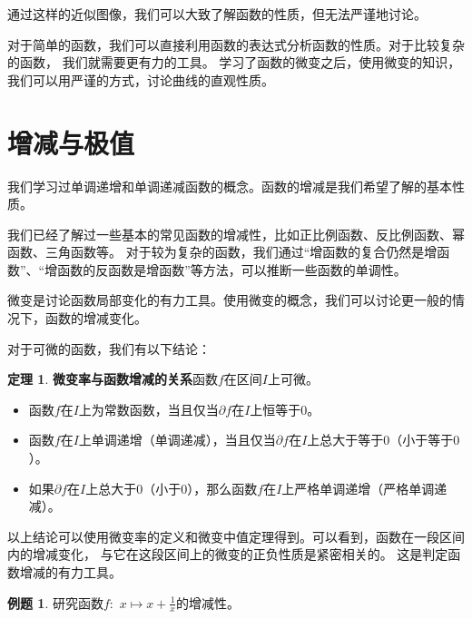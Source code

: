 \documentclass[12pt,UTF8]{ctexbook}
\theoremstyle{definition}
\newtheorem{tm}{定理}[section]
\newtheorem{et}{例题}[section]
\theoremstyle{plain}
\begin{document}
通过这样的近似图像，我们可以大致了解函数的性质，但无法严谨地讨论。

对于简单的函数，我们可以直接利用函数的表达式分析函数的性质。对于比较复杂的函数，
我们就需要更有力的工具。
学习了函数的微变之后，使用微变的知识，我们可以用严谨的方式，讨论曲线的直观性质。

\section{增减与极值}

我们学习过单调递增和单调递减函数的概念。函数的增减是我们希望了解的基本性质。

我们已经了解过一些基本的常见函数的增减性，比如正比例函数、反比例函数、幂函数、三角函数等。
对于较为复杂的函数，我们通过“增函数的复合仍然是增函数”、“增函数的反函数是增函数”等方法，可以推断一些函数的单调性。

微变是讨论函数局部变化的有力工具。使用微变的概念，我们可以讨论更一般的情况下，函数的增减变化。

对于可微的函数，我们有以下结论：
\begin{tm}{\textbf{微变率与函数增减的关系}}\label{tm:3-1-0}
    函数$f$在区间$I$上可微。
    \begin{itemize}
        \item 函数$f$在$I$上为常数函数，当且仅当$\partial f$在$I$上恒等于$0$。
        \item 函数$f$在$I$上单调递增（单调递减），当且仅当$\partial f$在$I$上总大于等于$0$（小于等于$0$）。
        \item 如果$\partial f$在$I$上总大于$0$（小于$0$），那么函数$f$在$I$上严格单调递增（严格单调递减）。
    \end{itemize} 
\end{tm}
以上结论可以使用微变率的定义和微变中值定理得到。可以看到，函数在一段区间内的增减变化，
与它在这段区间上的微变的正负性质是紧密相关的。
这是判定函数增减的有力工具。

\begin{et}
    研究函数$f:\,\,x\mapsto x + \frac{1}{x}$的增减性。
\end{et}
\end{document}

